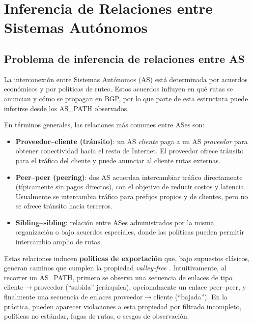 ﻿\section{Inferencia de Relaciones entre Sistemas Autónomos} \label{sec:anexo_inferencia_relaciones_as}


\subsection{Problema de inferencia de relaciones entre AS} \label{sec:anexo_inferencia_relaciones_as_problema}



La interconexión entre Sistemas Autónomos (AS) está determinada por acuerdos económicos y por políticas de ruteo. Estos acuerdos influyen en qué rutas se anuncian y cómo se propagan en BGP, por lo que parte de esta estructura puede inferirse desde los AS\_PATH observados.

En términos generales, las relaciones más comunes entre ASes son:
\begin{itemize}
    \item \textbf{Proveedor--cliente (tránsito)}: un AS \emph{cliente} paga a un AS \emph{proveedor} para obtener conectividad hacia el resto de Internet. El proveedor ofrece tránsito para el tráfico del cliente y puede anunciar al cliente rutas externas.
    \item \textbf{Peer--peer (peering)}: dos AS acuerdan intercambiar tráfico directamente (típicamente sin pagos directos), con el objetivo de reducir costos y latencia. Usualmente se intercambia tráfico para prefijos propios y de clientes, pero no se ofrece tránsito hacia terceros.
    \item \textbf{Sibling--sibling}: relación entre ASes administrados por la misma organización o bajo acuerdos especiales, donde las políticas pueden permitir intercambio amplio de rutas.
\end{itemize}

Estas relaciones inducen \textbf{políticas de exportación} que, bajo supuestos clásicos, generan caminos que cumplen la propiedad \textit{valley-free} \cite{InferringASRelatioships2001}. Intuitivamente, al recorrer un AS\_PATH, primero se observa una secuencia de enlaces de tipo cliente$\rightarrow$proveedor (``subida'' jerárquica), opcionalmente un enlace peer--peer, y finalmente una secuencia de enlaces proveedor$\rightarrow$cliente (``bajada''). En la práctica, pueden aparecer violaciones a esta propiedad por filtrado incompleto, políticas no estándar, fugas de rutas, o sesgos de observación.

